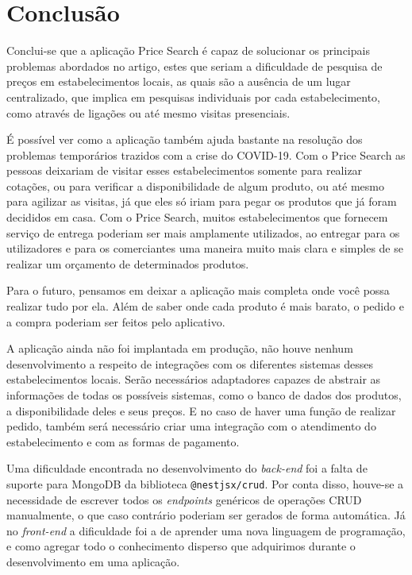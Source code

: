 \section{Conclusão}
\label{sec:conclusao}

Conclui-se que a aplicação Price Search é capaz de solucionar os principais problemas abordados no artigo, estes que seriam a dificuldade de pesquisa de preços em estabelecimentos locais, as quais são a ausência de um lugar centralizado, que implica em pesquisas individuais por cada estabelecimento, como através de ligações ou até mesmo visitas presenciais. 

É possível ver como a aplicação também ajuda bastante na resolução dos problemas temporários trazidos com a crise do COVID-19. Com o Price Search as pessoas deixariam de visitar esses estabelecimentos somente para realizar cotações, ou para verificar a disponibilidade de algum produto, ou até mesmo para agilizar as visitas, já que eles só iriam para pegar os produtos que já foram decididos em casa. Com o Price Search, muitos estabelecimentos que fornecem serviço de entrega poderiam ser mais amplamente utilizados, ao entregar para os utilizadores e para os comerciantes uma maneira muito mais clara e simples de se realizar um orçamento de determinados produtos.

Para o futuro, pensamos em deixar a aplicação mais completa onde você possa realizar tudo por ela. Além de saber onde cada produto é mais barato, o pedido e a compra poderiam ser feitos pelo aplicativo.

A aplicação ainda não foi implantada em produção, não houve nenhum desenvolvimento a respeito de integrações com os diferentes sistemas desses estabelecimentos locais. Serão necessários adaptadores capazes de abstrair as informações de todas os possíveis sistemas, como o banco de dados dos produtos, a disponibilidade deles e seus preços. E no caso de haver uma função de realizar pedido, também será necessário criar uma integração com o atendimento do estabelecimento e com as formas de pagamento.

Uma dificuldade encontrada no desenvolvimento do \textit{back-end} foi a falta de suporte para MongoDB da biblioteca \texttt{@nestjsx/crud}. Por conta disso, houve-se a necessidade de escrever todos os \textit{endpoints} genéricos de operações CRUD manualmente, o que caso contrário poderiam ser gerados de forma automática. Já no \textit{front-end} a dificuldade foi a de aprender uma nova linguagem de programação, e como agregar todo o conhecimento disperso que adquirimos durante o desenvolvimento em uma aplicação.